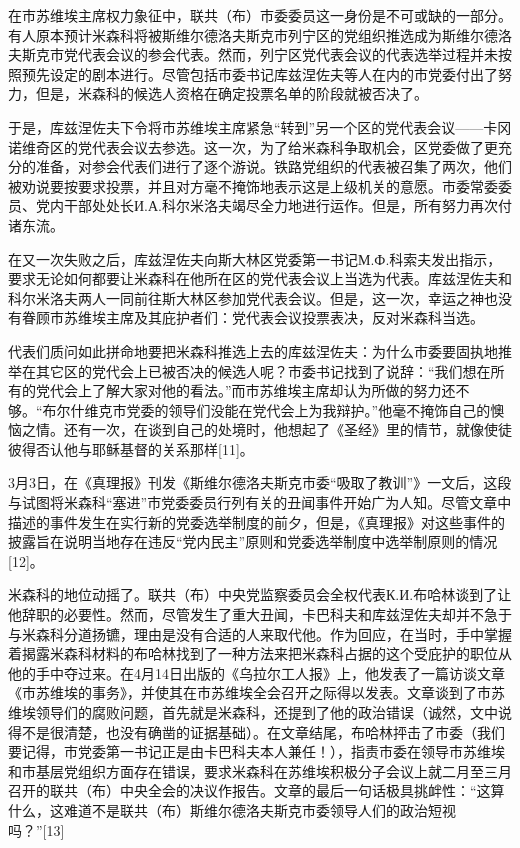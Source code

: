 在市苏维埃主席权力象征中，联共（布）市委委员这一身份是不可或缺的一部分。有人原本预计米森科将被斯维尔德洛夫斯克市列宁区的党组织推选成为斯维尔德洛夫斯克市党代表会议的参会代表。然而，列宁区党代表会议的代表选举过程并未按照预先设定的剧本进行。尽管包括市委书记库兹涅佐夫等人在内的市党委付出了努力，但是，米森科的候选人资格在确定投票名单的阶段就被否决了。

于是，库兹涅佐夫下令将市苏维埃主席紧急“转到”另一个区的党代表会议——卡冈诺维奇区的党代表会议去参选。这一次，为了给米森科争取机会，区党委做了更充分的准备，对参会代表们进行了逐个游说。铁路党组织的代表被召集了两次，他们被劝说要按要求投票，并且对方毫不掩饰地表示这是上级机关的意愿。市委常委委员、党内干部处处长И.А.科尔米洛夫竭尽全力地进行运作。但是，所有努力再次付诸东流。

在又一次失败之后，库兹涅佐夫向斯大林区党委第一书记М.Ф.科索夫发出指示，要求无论如何都要让米森科在他所在区的党代表会议上当选为代表。库兹涅佐夫和科尔米洛夫两人一同前往斯大林区参加党代表会议。但是，这一次，幸运之神也没有眷顾市苏维埃主席及其庇护者们：党代表会议投票表决，反对米森科当选。

代表们质问如此拼命地要把米森科推选上去的库兹涅佐夫：为什么市委要固执地推举在其它区的党代会上已被否决的候选人呢？市委书记找到了说辞：“我们想在所有的党代会上了解大家对他的看法。”而市苏维埃主席却认为所做的努力还不够。“布尔什维克市党委的领导们没能在党代会上为我辩护。”他毫不掩饰自己的懊恼之情。还有一次，在谈到自己的处境时，他想起了《圣经》里的情节，就像使徒彼得否认他与耶稣基督的关系那样[11]。

3月3日，在《真理报》刊发《斯维尔德洛夫斯克市委“吸取了教训”》一文后，这段与试图将米森科“塞进”市党委委员行列有关的丑闻事件开始广为人知。尽管文章中描述的事件发生在实行新的党委选举制度的前夕，但是，《真理报》对这些事件的披露旨在说明当地存在违反“党内民主”原则和党委选举制度中选举制原则的情况[12]。

米森科的地位动摇了。联共（布）中央党监察委员会全权代表К.И.布哈林谈到了让他辞职的必要性。然而，尽管发生了重大丑闻，卡巴科夫和库兹涅佐夫却并不急于与米森科分道扬镳，理由是没有合适的人来取代他。作为回应，在当时，手中掌握着揭露米森科材料的布哈林找到了一种方法来把米森科占据的这个受庇护的职位从他的手中夺过来。在4月14日出版的《乌拉尔工人报》上，他发表了一篇访谈文章《市苏维埃的事务》，并使其在市苏维埃全会召开之际得以发表。文章谈到了市苏维埃领导们的腐败问题，首先就是米森科，还提到了他的政治错误（诚然，文中说得不是很清楚，也没有确凿的证据基础）。在文章结尾，布哈林抨击了市委（我们要记得，市党委第一书记正是由卡巴科夫本人兼任！），指责市委在领导市苏维埃和市基层党组织方面存在错误，要求米森科在苏维埃积极分子会议上就二月至三月召开的联共（布）中央全会的决议作报告。文章的最后一句话极具挑衅性：“这算什么，这难道不是联共（布）斯维尔德洛夫斯克市委领导人们的政治短视吗？”[13]


